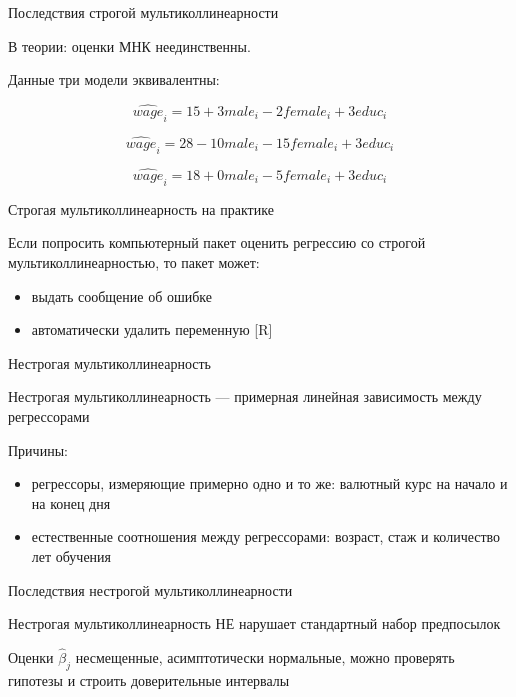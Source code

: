 \documentclass[russian,ignorenonframetext,]{beamer}
\providecommand{\tightlist}{%
  \setlength{\itemsep}{0pt}\setlength{\parskip}{0pt}}
\begin{document}
\begin{frame}{Последствия строгой мультиколлинеарности}

В теории: оценки МНК неединственны.

Данные три модели эквивалентны:

\[
\widehat{wage}_i=15 + 3 male_i -2 female_i + 3 educ_i 
\]

\[
\widehat{wage}_i=28 -10 male_i -15 female_i + 3 educ_i 
\]

\[
\widehat{wage}_i=18 + 0 male_i -5 female_i + 3 educ_i 
\]

\end{frame}

\begin{frame}{Строгая мультиколлинеарность на практике}

Если попросить компьютерный пакет оценить регрессию со строгой
мультиколлинеарностью, то пакет может:

\begin{itemize}
\tightlist
\item
  выдать сообщение об ошибке
\item
  автоматически удалить переменную {[}R{]}
\end{itemize}

\end{frame}

\begin{frame}{Нестрогая мультиколлинеарность}

Нестрогая мультиколлинеарность --- примерная линейная зависимость между
регрессорами

Причины:

\begin{itemize}
\tightlist
\item
  регрессоры, измеряющие примерно одно и то же: валютный курс на начало
  и на конец дня
\item
  естественные соотношения между регрессорами: возраст, стаж и
  количество лет обучения
\end{itemize}

\end{frame}

\begin{frame}{Последствия нестрогой мультиколлинеарности}

Нестрогая мультиколлинеарность НЕ нарушает стандартный набор предпосылок

Оценки \(\hat{\beta}_j\) несмещенные, асимптотически нормальные, можно
проверять гипотезы и строить доверительные интервалы

\end{frame}
\end{document}
